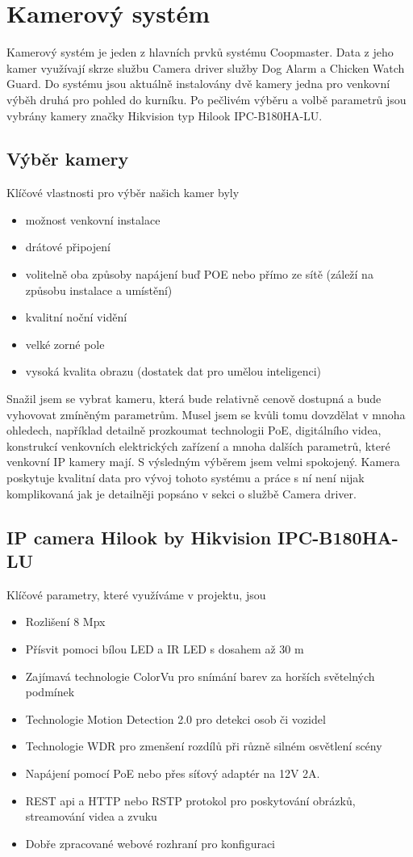 \section{Kamerový systém}\label{sec:kamerovy-system}
Kamerový systém je jeden z hlavních prvků systému Coopmaster.
Data z jeho kamer využívají skrze službu Camera driver služby Dog Alarm a Chicken Watch Guard.
Do systému jsou aktuálně instalovány dvě kamery jedna pro venkovní výběh druhá pro pohled do kurníku.
Po pečlivém výběru a volbě parametrů jsou vybrány kamery značky Hikvision typ Hilook IPC-B180HA-LU.

\subsection*{Výběr kamery}
Klíčové vlastnosti pro výběr našich kamer byly
\begin{itemize}
    \item[] možnost venkovní instalace
    \item[] drátové připojení
    \item[] volitelně oba způsoby napájení buď POE nebo přímo ze sítě (záleží na způsobu instalace a umístění)
    \item[] kvalitní noční vidění
    \item[] velké zorné pole
    \item[] vysoká kvalita obrazu (dostatek dat pro umělou inteligenci)
\end{itemize}
Snažil jsem se vybrat kameru, která bude relativně cenově dostupná a bude vyhovovat zmíněným parametrům.
Musel jsem se kvůli tomu dovzdělat v mnoha ohledech, například detailně prozkoumat technologii PoE, digitálního videa, konstrukcí venkovních elektrických zařízení a mnoha dalších parametrů, které venkovní IP kamery mají.
S výsledným výběrem jsem velmi spokojený.
Kamera poskytuje kvalitní data pro vývoj tohoto systému a práce s ní není nijak komplikovaná jak je detailněji popsáno v sekci o službě Camera driver.

\subsection*{IP camera Hilook by Hikvision IPC-B180HA-LU}
Klíčové parametry, které využíváme v projektu, jsou
\begin{itemize}
    \item[] Rozlišení 8 Mpx
    \item[] Přísvit pomoci bílou LED a IR LED s dosahem až 30 m
    \item[] Zajímavá technologie ColorVu pro snímání barev za horších světelných podmínek
    \item[] Technologie Motion Detection 2.0 pro detekci osob či vozidel
    \item[] Technologie WDR pro zmenšení rozdílů při různě silném osvětlení scény
    \item[] Napájení pomocí PoE nebo přes síťový adaptér na 12V 2A.
    \item[] REST api a HTTP nebo RSTP protokol pro poskytování obrázků, streamování videa a zvuku
    \item[] Dobře zpracované webové rozhraní pro konfiguraci
\end{itemize}

%
%
%
